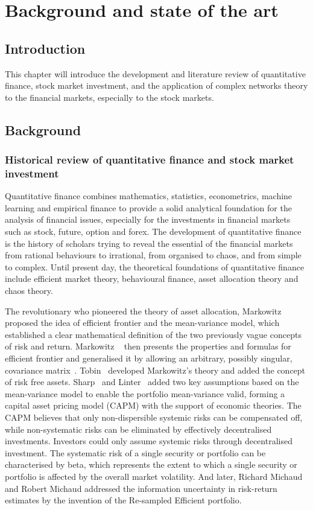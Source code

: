 \chapter[Background]{Background and state of the art}
\label{cpt:back}

\section{Introduction}
This chapter will introduce the development and literature review of quantitative finance, stock market investment, and the application of complex networks theory to the financial markets, especially to the stock markets.

\section{Background}
\subsection{Historical review of quantitative finance and stock market investment}
Quantitative finance combines mathematics, statistics, econometrics, machine learning and empirical finance to provide a solid analytical foundation for the analysis of financial issues, especially for the investments in financial markets such as stock, future, option and forex. The development of quantitative finance is the history of scholars trying to reveal the essential of the financial markets from rational behaviours to irrational, from organised to chaos, and from simple to complex. Until present day, the theoretical foundations of quantitative finance include efficient market theory, behavioural finance, asset allocation theory and chaos theory.

The revolutionary who pioneered the theory of asset allocation, Markowitz \cite{portfolio} proposed the idea of efficient frontier and the mean-variance model, which established a clear mathematical definition of the two previously vague concepts of risk and return. Markowitz ~\cite{markowitz1956optimization} then presents the properties and formulas for efficient frontier and generalised it by allowing an arbitrary, possibly singular, covariance matrix~\cite{markowitz1959portfolio}. Tobin~\cite{tobin1958liquidity} developed Markowitz's theory and added the concept of risk free assets. Sharp~\cite{equilibrium} and Linter~\cite{diversification} added two key assumptions based on the mean-variance model to enable the portfolio mean-variance valid, forming a capital asset pricing model (CAPM) with the support of economic theories. The CAPM believes that only non-dispersible systemic risks can be compensated off, while non-systematic risks can be eliminated by effectively decentralised investments. Investors could only assume systemic risks through decentralised investment. The systematic risk of a single security or portfolio can be characterised by beta, which represents the extent to which a single security or portfolio is affected by the overall market volatility. And later, Richard Michaud and Robert Michaud \cite{michaud1998asset} addressed the information uncertainty in risk-return estimates by the invention of the Re-sampled Efficient portfolio.

